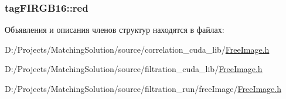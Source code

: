 \hypertarget{structtag_f_i_r_g_b16_eaa2393246d6482c02cac30d169ee022}{
\subsubsection[{red}]{ {\bf tagFIRGB16::red}}}
\label{structtag_f_i_r_g_b16_eaa2393246d6482c02cac30d169ee022}




Объявления и описания членов структур находятся в файлах:\begin{CompactItemize}
\item 
D:/Projects/MatchingSolution/source/correlation\_\-cuda\_\-lib/\hyperlink{correlation__cuda__lib_2_free_image_8h}{FreeImage.h}\item 
D:/Projects/MatchingSolution/source/filtration\_\-cuda\_\-lib/\hyperlink{filtration__cuda__lib_2_free_image_8h}{FreeImage.h}\item 
D:/Projects/MatchingSolution/source/filtration\_\-run/freeImage/\hyperlink{filtration__run_2free_image_2_free_image_8h}{FreeImage.h}\end{CompactItemize}
